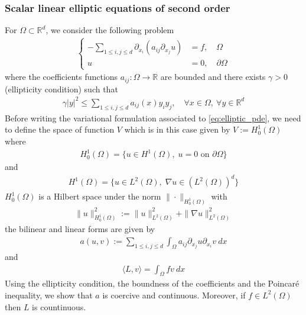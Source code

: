 \subsubsection*{Scalar linear elliptic equations of second order}
For $\Omega \subset \mathbb{R}^d$, we consider the following problem
\begin{align}
  \left\{ 
  \begin{array}{rl}
    - \sum\limits_{1 \leq i,j \leq d} \partial_{x_i} \left( a_{ij} \partial_{x_j} u \right) &= f, \quad \Omega 
    \\
    u &= 0, \quad \partial\Omega
  \end{array} \right.
  \label{eq:elliptic_pde}
\end{align}
where the coefficients functions $a_{ij} : \Omega \rightarrow \mathbb{R}$ are bounded and there exists $\gamma > 0$ (ellipticity condition) such that
\begin{align}
  \gamma | y |^2 \leq  \sum\limits_{1 \leq i,j \leq d} a_{ij}(x) y_i y_j, \quad \forall x \in \Omega, ~\forall y \in \mathbb{R}^d   
\end{align}
Before writing the variational formulation associated to \eqref{eq:elliptic_pde}, we need to define the space of function $V$ which is in this case given by $V := H^1_0(\Omega)$ where
\begin{align}
  H^1_0(\Omega) = \{ u\in H^1(\Omega) , \;   u=0 \mbox{ on } \partial \Omega \}
  \label{eq:h1_0_space}
\end{align}
and
\begin{align}
  H^1(\Omega) = \{ u\in L^2(\Omega), \;  \nabla u\in (L^2(\Omega))^d \}
  \label{eq:h1_space}
\end{align}
$H^1_0(\Omega)$ is a Hilbert space under the norm $\| \cdot \|_{H^1_0(\Omega)}$ with
\begin{align}
  \| u \|_{H^1_0(\Omega)}^2 := \| u \|_{L^2(\Omega)}^2 + \| \nabla u \|_{L^2(\Omega)}^2 
  \label{eq:h1_0_norm}
\end{align}
the bilinear and linear forms are given by
\begin{align*}
  a(u,v) := \sum\limits_{1 \leq i,j \leq d} \int_{\Omega} a_{ij} \partial_{x_j} u \partial_{x_i} v ~ dx 
\end{align*}
and
\begin{align*}
  \langle L, v \rangle = \int_{\Omega} f v ~ dx
\end{align*}
Using the ellipticity condition, the boundness of the coefficients and the Poincar\'e inequality, we show that $a$ is coercive and continuous. Moreover, if $f \in L^2(\Omega)$ then $L$ is countinuous.

